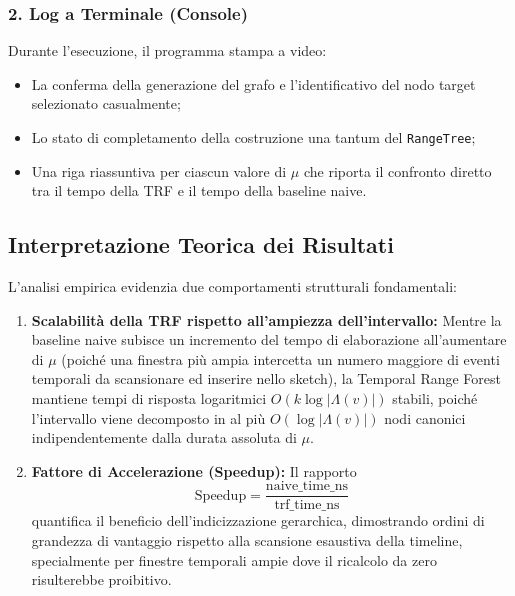 \subsubsection{2. Log a Terminale (Console)}
Durante l'esecuzione, il programma stampa a video:
\begin{itemize}
    \item La conferma della generazione del grafo e l'identificativo del nodo target selezionato casualmente;
    \item Lo stato di completamento della costruzione una tantum del \texttt{RangeTree};
    \item Una riga riassuntiva per ciascun valore di $\mu$ che riporta il confronto diretto tra il tempo della TRF e il tempo della baseline naive.
\end{itemize}

\subsection{Interpretazione Teorica dei Risultati}
L'analisi empirica evidenzia due comportamenti strutturali fondamentali:
\begin{enumerate}
    \item \textbf{Scalabilità della TRF rispetto all'ampiezza dell'intervallo:}
    Mentre la baseline naive subisce un incremento del tempo di elaborazione all'aumentare di $\mu$ (poiché una finestra più ampia intercetta un numero maggiore di eventi temporali da scansionare ed inserire nello sketch), la Temporal Range Forest mantiene tempi di risposta logaritmici $O(k \log |\Lambda(v)|)$ stabili, poiché l'intervallo viene decomposto in al più $O(\log |\Lambda(v)|)$ nodi canonici indipendentemente dalla durata assoluta di $\mu$.
    
    \item \textbf{Fattore di Accelerazione (Speedup):}
    Il rapporto
    \[
    \text{Speedup} = \frac{\text{naive\_time\_ns}}{\text{trf\_time\_ns}}
    \]
    quantifica il beneficio dell'indicizzazione gerarchica, dimostrando ordini di grandezza di vantaggio rispetto alla scansione esaustiva della timeline, specialmente per finestre temporali ampie dove il ricalcolo da zero risulterebbe proibitivo.
\end{enumerate}